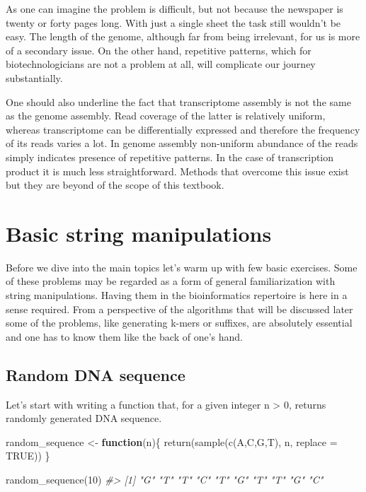 \documentclass[
]{book}
\newenvironment{Shaded}{\begin{snugshade}}{\end{snugshade}}
\newcommand{\AttributeTok}[1]{\textcolor[rgb]{0.77,0.63,0.00}{#1}}
\newcommand{\CommentTok}[1]{\textcolor[rgb]{0.56,0.35,0.01}{\textit{#1}}}
\newcommand{\ConstantTok}[1]{\textcolor[rgb]{0.00,0.00,0.00}{#1}}
\newcommand{\ControlFlowTok}[1]{\textcolor[rgb]{0.13,0.29,0.53}{\textbf{#1}}}
\newcommand{\DecValTok}[1]{\textcolor[rgb]{0.00,0.00,0.81}{#1}}
\newcommand{\FunctionTok}[1]{\textcolor[rgb]{0.00,0.00,0.00}{#1}}
\newcommand{\NormalTok}[1]{#1}
\newcommand{\OtherTok}[1]{\textcolor[rgb]{0.56,0.35,0.01}{#1}}
\newcommand{\StringTok}[1]{\textcolor[rgb]{0.31,0.60,0.02}{#1}}
\begin{document}
As one can imagine the problem is difficult, but not because the newspaper is twenty or forty pages long. With just a single sheet the task still wouldn't be easy. The length of the genome, although far from being irrelevant, for us is more of a secondary issue. On the other hand, repetitive patterns, which for biotechnologicians are not a problem at all, will complicate our journey substantially.

One should also underline the fact that transcriptome assembly is not the same as the genome assembly. Read coverage of the latter is relatively uniform, whereas transcriptome can be differentially expressed and therefore the frequency of its reads varies a lot. In genome assembly non-uniform abundance of the reads simply indicates presence of repetitive patterns. In the case of transcription product it is much less straightforward. Methods that overcome this issue exist but they are beyond of the scope of this textbook.

\hypertarget{basic}{%
\chapter{Basic string manipulations}\label{basic}}

Before we dive into the main topics let's warm up with few basic exercises. Some of these problems may be regarded as a form of general familiarization with string manipulations. Having them in the bioinformatics repertoire is here in a sense required. From a perspective of the algorithms that will be discussed later some of the problems, like generating k-mers or suffixes, are absolutely essential and one has to know them like the back of one's hand.

\hypertarget{random-dna-sequence}{%
\section{Random DNA sequence}\label{random-dna-sequence}}

Let's start with writing a function that, for a given integer n \textgreater{} 0, returns randomly generated DNA sequence.

\begin{Shaded}
\begin{Highlighting}[]
\NormalTok{random\_sequence }\OtherTok{\textless{}{-}} \ControlFlowTok{function}\NormalTok{(n)\{}
  \FunctionTok{return}\NormalTok{(}\FunctionTok{sample}\NormalTok{(}\FunctionTok{c}\NormalTok{(}\StringTok{\textquotesingle{}A\textquotesingle{}}\NormalTok{,}\StringTok{\textquotesingle{}C\textquotesingle{}}\NormalTok{,}\StringTok{\textquotesingle{}G\textquotesingle{}}\NormalTok{,}\StringTok{\textquotesingle{}T\textquotesingle{}}\NormalTok{), n, }\AttributeTok{replace =} \ConstantTok{TRUE}\NormalTok{))}
\NormalTok{\}}

\FunctionTok{random\_sequence}\NormalTok{(}\DecValTok{10}\NormalTok{)}
\CommentTok{\#\textgreater{}  [1] "G" "T" "T" "C" "T" "G" "T" "T" "G" "C"}
\end{Highlighting}
\end{Shaded}
\end{document}
